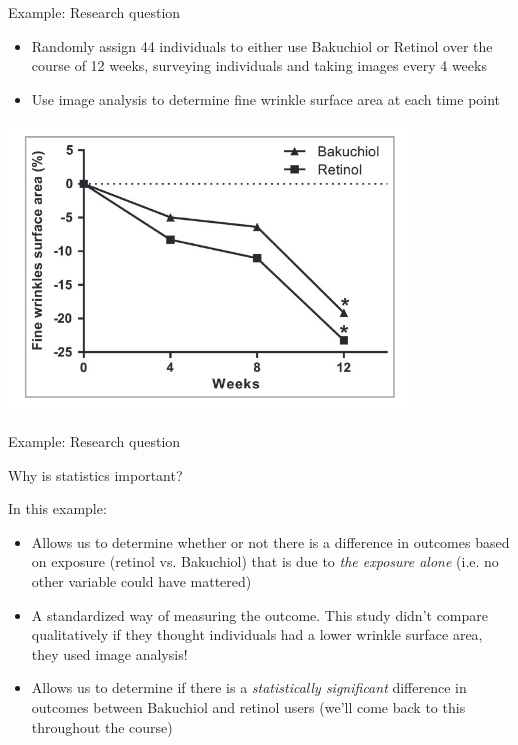 \documentclass[10pt,t]{beamer}
\begin{document}
\begin{frame}{Example: Research question}

\begin{itemize}
	\item Randomly assign 44 individuals to either use Bakuchiol or Retinol over the course of 12 weeks, surveying individuals and taking images every 4 weeks 
	\item Use image analysis to determine fine wrinkle surface area at each time point
\end{itemize}

\centering \includegraphics[scale=0.4]{retinol.png}

\end{frame}

\begin{frame}{Example: Research question}

Why is statistics important?

\vspace{0.3cm}

In this example:
\begin{itemize}
	\item Allows us to determine whether or not there is a difference in outcomes based on exposure (retinol vs. Bakuchiol) that is due to \textit{the exposure alone} (i.e. no other variable could have mattered)
	\item A standardized way of measuring the outcome. This study didn't compare qualitatively if they thought individuals had a lower wrinkle surface area, they used image analysis!
	\item Allows us to determine if there is a \textit{statistically significant} difference in outcomes between Bakuchiol and retinol users (we'll come back to this throughout the course)
\end{itemize}

\end{frame}
\end{document}
